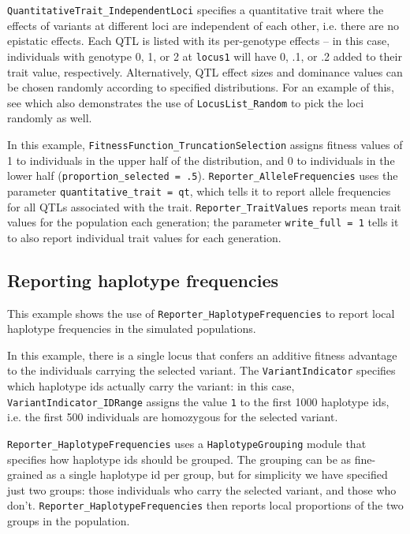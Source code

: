 \documentclass{article}
\begin{document}
\texttt{QuantitativeTrait\_IndependentLoci} specifies a quantitative trait where
the effects of variants at different loci are independent of each other, i.e. there
are no epistatic effects.  Each QTL is listed with its per-genotype effects -- in 
this case, individuals with genotype 0, 1, or 2 at \texttt{locus1} will have
0, .1, or .2 added to their trait value, respectively.  Alternatively, QTL effect
sizes and dominance values can be chosen randomly according to specified
distributions.  For an example of this, see 
which also demonstrates the use of \texttt{LocusList\_Random} to pick the loci
randomly as well.

\begin{sloppypar}
In this example, \texttt{FitnessFunction\_TruncationSelection} assigns fitness
values of 1 to individuals in the upper half of the distribution, and 0 to
individuals in the lower half (\texttt{proportion\_selected = .5}).
\texttt{Reporter\_AlleleFrequencies} uses the parameter
\texttt{quantitative\_trait = qt}, which tells it to report allele frequencies
for all QTLs associated with the trait.  \texttt{Reporter\_TraitValues} reports
mean trait values for the population each generation; the parameter
\texttt{write\_full = 1} tells it to also report individual trait values for
each generation.
\end{sloppypar}


\subsection{Reporting haplotype frequencies}

This example shows the use of \texttt{Reporter\_HaplotypeFrequencies} to
report local haplotype frequencies in the simulated populations.  

\begin{sloppypar}
In this example, there is a single locus that confers an additive fitness
advantage to the individuals carrying the selected variant.  The
\texttt{VariantIndicator} specifies which haplotype ids actually carry the
variant:  in this case, \texttt{VariantIndicator\_IDRange} assigns the value
\texttt{1} to the first 1000 haplotype ids, i.e. the first 500 individuals are
homozygous for the selected variant.
\end{sloppypar}

\texttt{Reporter\_HaplotypeFrequencies} uses a \texttt{HaplotypeGrouping} module
that specifies how haplotype ids should be grouped.  The grouping can be as
fine-grained as a single haplotype id per group, but for simplicity we have
specified just two groups:  those individuals who carry the selected variant,
and those who don't.  \texttt{Reporter\_HaplotypeFrequencies} then reports
local proportions of the two groups in the population.
\end{document}
